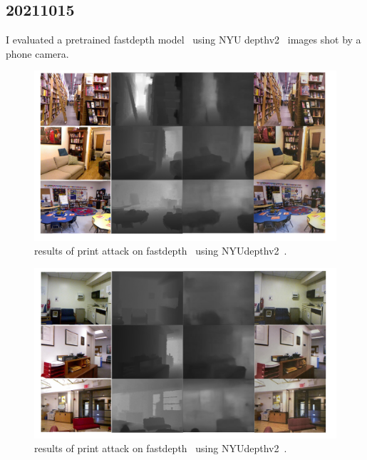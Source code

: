 \documentclass[10pt]{beamer}
\begin{document}
\subsection{20211015}
\begin{frame}
  I evaluated a pretrained fastdepth model~\cite{fastdepth} using NYU
  depthv2~\cite{nyudepthv2} images shot by a phone camera.  
  \begin{figure}
    \includegraphics[width=1\linewidth]{figure/20211015/result1.pdf}
    \caption{results of print attack on fastdepth~\cite{fastdepth}
    using NYUdepthv2~\cite{nyudepthv2}.}
  \end{figure}
\end{frame}

\begin{frame}
  \begin{figure}
    \includegraphics[width=1\linewidth]{figure/20211015/result2.pdf}
    \caption{results of print attack on fastdepth~\cite{fastdepth}
    using NYUdepthv2~\cite{nyudepthv2}.}
  \end{figure}
\end{frame}
\end{document}

